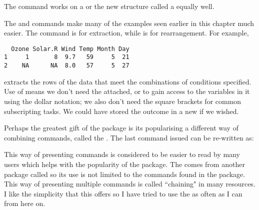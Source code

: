 The  command works on a  or the new structure called a  equally well. 
  
The  and  commands make many of the examples seen earlier in this chapter much easier. The  command is for extraction, while  is for rearrangement. For example, 
\begin{knitrout}
\color{fgcolor}\begin{kframe}
\begin{alltt}
\hlstd{> }\hlopt{<}\hlopt{&}\hlopt{<}\hlstd{)}
\end{alltt}
\begin{verbatim}
  Ozone Solar.R Wind Temp Month Day
1     1       8  9.7   59     5  21
2    NA      NA  8.0   57     5  27
\end{verbatim}
\end{kframe}
\end{knitrout}
extracts the rows of the  data that meet the combinations of conditions specified.  
Use of  means we don't need the  attached, or to gain access to the variables in it using the dollar notation; we also don't need the square brackets for common subscripting tasks. We could have stored the outcome in a new  if we wished. 
 
Perhaps the greatest gift of the  package is its popularising a different way of combining commands, called the . The last command issued can be re-written as: 
\begin{knitrout}
\color{fgcolor}
\end{knitrout}
This way of presenting commands is considered to be easier to read by many users which helps with the popularity of the   package. The  comes from another package called  so its use is not limited to the commands found in the  package.  
This way of presenting multiple commands is called ``chaining" in many resources. I like the simplicity that this offers so I have tried to use the  as often as I can from here on. 
  
